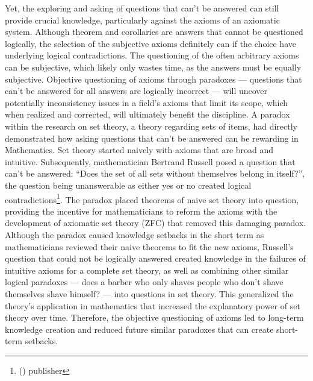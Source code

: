 \documentclass[a4paper,12pt]{article}
\newcommand{\citefoot}[1]{\footnote{\citeall{#1}}}
\newcommand{\citeall}[1]{\citeauth{#1} \citetitle{#1} (\citeyear{#1}) publisher \citelist{#1}{publisher}}
\begin{document}
Yet, the exploring and asking of questions that can’t be answered can still provide crucial knowledge, particularly against the axioms of an axiomatic system. Although theorem and corollaries are answers that cannot be questioned logically, the selection of the subjective axioms definitely can if the choice have underlying logical contradictions. The questioning of the often arbitrary axioms can be subjective, which likely only wastes time, as the answers must be equally subjective. Objective questioning of axioms through paradoxes --- questions that can’t be answered for all answers are logically incorrect --– will uncover potentially inconsistency issues in a field's axioms that limit its scope, which when realized and corrected, will ultimately benefit the discipline. A paradox within the research on set theory, a theory regarding sets of items, had directly demonstrated how asking questions that can’t be answered can be rewarding in Mathematics. Set theory started naively with axioms that are broad and intuitive. Subsequently, mathematician Bertrand Russell posed a question that can’t be answered: ``Does the set of all sets without themselves belong in itself?'', the question being unanswerable as either yes or no created logical contradictions\citefoot{irvine_deutsch_2020}. The paradox placed theorems of naive set theory into question, providing the incentive for mathematicians to reform the axioms with the development of axiomatic set theory (ZFC) that removed this damaging paradox. Although the paradox caused knowledge setbacks in the short term as mathematicians reviewed their naive theorems to fit the new axioms, Russell’s question that could not be logically answered created knowledge in the failures of intuitive axioms for a complete set theory, as well as combining other similar logical paradoxes --- does a barber who only shaves people who don’t shave themselves shave himself? --- into questions in set theory. This generalized the theory's application in mathematics that increased the explanatory power of set theory over time. Therefore, the objective questioning of axioms led to long-term knowledge creation and reduced future similar paradoxes that can create short-term setbacks.


\end{document}
